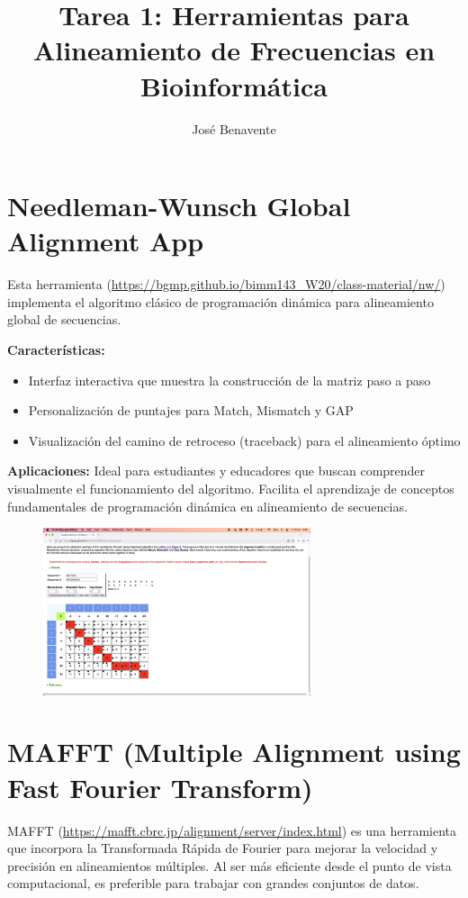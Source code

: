 \documentclass[11pt,a4paper]{article}
\title{\textbf{Tarea 1: Herramientas para Alineamiento de Frecuencias en Bioinformática}}
\author{José Benavente}
\date{}
\begin{document}
	
	\maketitle
	
	\section*{Needleman-Wunsch Global Alignment App}
	\noindent Esta herramienta (\url{https://bgmp.github.io/bimm143_W20/class-material/nw/}) implementa el algoritmo clásico de programación dinámica para alineamiento global de secuencias.
	
	\noindent \textbf{Características:} 
	\begin{itemize}[noitemsep,topsep=0pt,leftmargin=*]
		\item Interfaz interactiva que muestra la construcción de la matriz paso a paso
		\item Personalización de puntajes para Match, Mismatch y GAP
		\item Visualización del camino de retroceso (traceback) para el alineamiento óptimo
	\end{itemize}
	
	\noindent \textbf{Aplicaciones:} Ideal para estudiantes y educadores que buscan comprender visualmente el funcionamiento del algoritmo. Facilita el aprendizaje de conceptos fundamentales de programación dinámica en alineamiento de secuencias.
	
	\begin{figure}[h]
		\centering
		\includegraphics[width=0.7\textwidth]{img/needleman.png}
	\end{figure}
	
	\section*{MAFFT (Multiple Alignment using Fast Fourier Transform)}
	\noindent MAFFT (\url{https://mafft.cbrc.jp/alignment/server/index.html}) es una herramienta que incorpora la Transformada Rápida de Fourier para mejorar la velocidad y precisión en alineamientos múltiples. Al ser más eficiente desde el punto de vista computacional, es preferible para trabajar con grandes conjuntos de datos.
	
\end{document}
